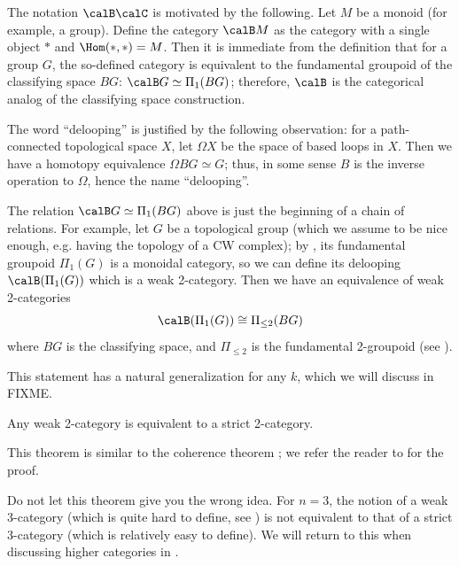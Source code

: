 \begin{remark}\label{r:BG}
    The notation $\calB\calC$ is motivated by the following. Let $M$ be a
    monoid (for example, a group). Define the category $\calB M$ as the
    category with a single object $*$ and $\Hom(*,*)=M$. Then it is immediate
    from the definition that for a group $G$, the so-defined category is
    equivalent to the fundamental groupoid of the classifying space $BG$:
    $\calB G\simeq \Pi_1(BG)$; therefore, $\calB$ is the categorical analog of
    the classifying space construction.

  The word ``delooping'' is justified by the following observation: for a
  path-connected topological space $X$, let $\Omega X$ be the space of based
  loops in $X$. Then we have a homotopy equivalence $\Omega BG \simeq G$; thus,
  in some sense $B$ is the inverse operation to $\Omega$, hence the name
  ``delooping''.

  The relation $\calB G\simeq \Pi_1(BG)$ above is just the beginning of a chain
  of relations. For example, let $G$ be a topological
  group (which we assume to be nice enough, e.g. having the topology of a CW
  complex); by , its fundamental groupoid $\Pi_1(G)$ is a
  monoidal category, so we can define its delooping $\calB (\Pi_1(G))$ which is
  a weak 2-category. Then we have an equivalence of weak 2-categories
  \begin{equation}
    \calB (\Pi_1(G))\cong \Pi_{\le 2}(BG)
  \end{equation}
  where $BG$ is the classifying space, and $\Pi_{\le 2}$ is the fundamental
  2-groupoid (see ).

  This statement has a natural generalization for any $k$, which we will
  discuss in FIXME.
\end{remark}

\begin{theorem}\label{t:strictify-bicategories}
  Any weak 2-category is equivalent to a strict 2-category.
\end{theorem}
This theorem is similar to the coherence theorem ; we refer
the reader to \cite[Theorem 1.5.15]{leinster} for the proof.

\begin{remark}\label{r:stictify-3-cat}
  Do not let this theorem give you the wrong idea. For $n=3$, the notion of a
  weak $3$-category (which is quite hard to define, see
  \cite{gordon-power-street}) is not equivalent to that of a strict 3-category
  (which is relatively easy to define). We will return to this when discussing
  higher categories in .
\end{remark}


